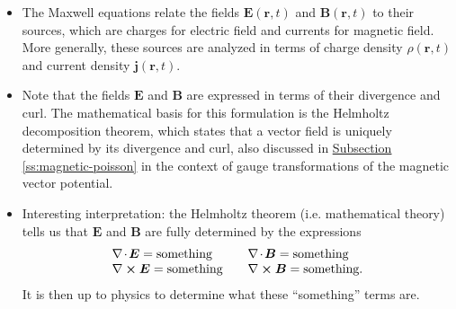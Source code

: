 \documentclass[11pt, a4paper]{article}
\renewcommand{\vec}[1]{\bm{#1}} %
\renewcommand{\r}{\vec{r}}
\newcommand{\E}{\vec{E}} %
\newcommand{\B}{\vec{B}} %
\renewcommand{\j}{\vec{j}}  %
\renewcommand{\div}{\nabla \mspace{-2mu} \cdot \mspace{-2mu}}
\renewcommand{\curl}{\nabla \cross}
\begin{document}
\begin{itemize}
	\item The Maxwell equations relate the fields $ \E(\r, t) $ and $ \B(\r, t) $ to their sources, which are charges for electric field and currents for magnetic field. More generally, these sources are analyzed in terms of charge density $ \rho(\r, t) $ and current density $ \j(\r, t) $.
	
	\item Note that the fields $ \E $ and $ \B $ are expressed in terms of their divergence and curl. The mathematical basis for this formulation is the Helmholtz decomposition theorem, which states that a vector field is uniquely determined by its divergence and curl, also discussed in \hyperref[ss:magnetic-poisson]{\underline{Subsection \ref{ss:magnetic-poisson}}} in the context of gauge transformations of the magnetic vector potential.
        
	\item Interesting interpretation: the Helmholtz theorem (i.e. mathematical theory) tells us that $ \E $ and $ \B $ are fully determined by the expressions
	\[
	\begin{array}{ll}
		\div \E = \text{something} & \quad \div \B = \text{something} \\
		\curl \E = \text{something} & \quad \curl \B = \text{something}.
	\end{array}
	\]
	It is then up to physics to determine what these ``something'' terms are.
	
\end{itemize}
\end{document}
